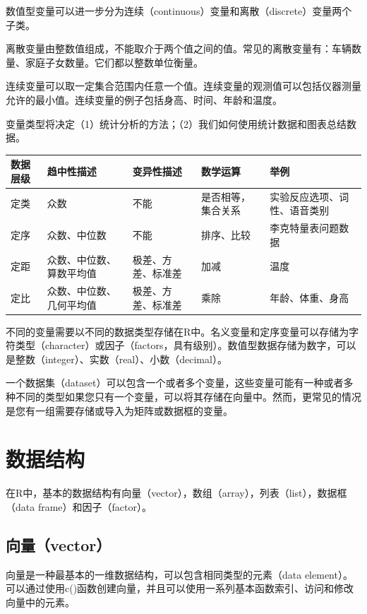 \documentclass[]{book}
\begin{document}
数值型变量可以进一步分为连续（continuous）变量和离散（discrete）变量两个子类。

离散变量由整数值组成，不能取介于两个值之间的值。常见的离散变量有：车辆数量、家庭子女数量。它们都以整数单位衡量。

连续变量可以取一定集合范围内任意一个值。连续变量的观测值可以包括仪器测量允许的最小值。连续变量的例子包括身高、时间、年龄和温度。

变量类型将决定（1）统计分析的方法；（2）我们如何使用统计数据和图表总结数据。

\begin{longtable}[]{@{}lllll@{}}
\toprule
数据层级 & 趋中性描述 & 变异性描述 & 数学运算 & 举例\tabularnewline
\midrule
\endhead
定类 & 众数 & 不能 & 是否相等，集合关系 & 实验反应选项、词性、语音类别\tabularnewline
定序 & 众数、中位数 & 不能 & 排序、比较 & 李克特量表问题数据\tabularnewline
定距 & 众数、中位数、算数平均值 & 极差、方差、标准差 & 加减 & 温度\tabularnewline
定比 & 众数、中位数、几何平均值 & 极差、方差、标准差 & 乘除 & 年龄、体重、身高\tabularnewline
\bottomrule
\end{longtable}

不同的变量需要以不同的数据类型存储在R中。名义变量和定序变量可以存储为字符类型（character）或因子（factors，具有级别）。数值型数据存储为数字，可以是整数（integer）、实数（real）、小数（decimal）。

一个数据集（dataset）可以包含一个或者多个变量，这些变量可能有一种或者多种不同的类型如果您只有一个变量，可以将其存储在向量中。然而，更常见的情况是您有一组需要存储或导入为矩阵或数据框的变量。

\hypertarget{ux6570ux636eux7ed3ux6784}{%
\section{数据结构}\label{ux6570ux636eux7ed3ux6784}}

在R中，基本的数据结构有向量（vector），数组（array），列表（list），数据框（data frame）和因子（factor）。

\hypertarget{ux5411ux91cfvector}{%
\subsection{向量（vector）}\label{ux5411ux91cfvector}}

向量是一种最基本的一维数据结构，可以包含相同类型的元素（data element）。可以通过使用c()函数创建向量，并且可以使用一系列基本函数索引、访问和修改向量中的元素。
\end{document}

